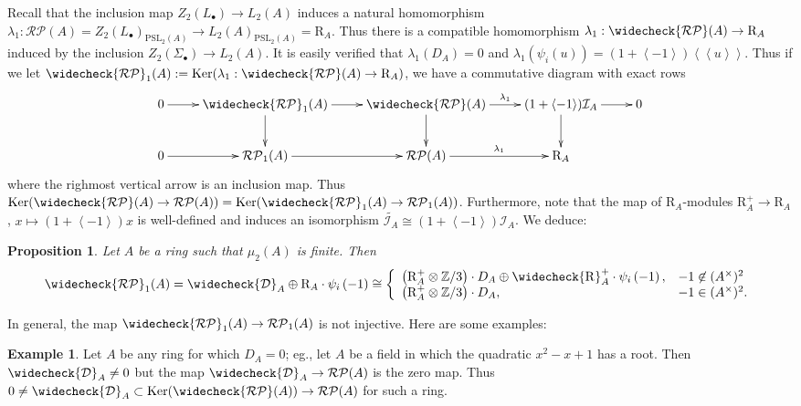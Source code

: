 \documentclass[12pt]{amsart}
\newtheorem{prop}[lem]{Proposition}
\theoremstyle{definition}
\newtheorem{exa}[lem]{Example}
\newcommand{\Z}{\Bbb{Z}}
\newcommand{\pspl}[2]{\mathrm{PSL}_{#1}(#2)}
\newcommand{\rpb}[1]{\mathcal{RP}(#1)}%
\newcommand{\rpbker}[1]{\mathcal{RP}_1(#1)}%
\newcommand{\crpbker}[1]{\widecheck{\mathcal{RP}}_1(#1)}
\newcommand{\crpb}[1]{\widecheck{\mathcal{RP}}(#1)}
\newcommand{\suss}[2]{\psi_{#1}\left( #2\right)}
\newcommand{\cconst}[1]{D_{#1}}
\newcommand{\ccconstmod}[1]{\widecheck{\mathcal{D}}_{#1}}
\newcommand{\<}{\langle}
\renewcommand{\>}{\rangle}
\renewcommand{\ker}[1]{\mathrm{Ker}(#1)}
\newcommand{\sgr}[1]{\mathrm{R}_{#1}}%
\newcommand{\qsgr}[1]{\mathrm{R}^{+}_{#1}} %
\newcommand{\tsgr}[1]{\widecheck{\mathrm{R}}^{+}_{#1}} %
\newcommand{\an}[1]{\left\langle{#1}\right\rangle}
\newcommand{\pf}[1]{\left\langle\!\left\langle{#1}\right\rangle\!\right\rangle}
\newcommand{\aug}[1]{\mathcal{I}_{#1}}
\begin{document}
Recall that the inclusion map $Z_2(L_\bullet)\to L_2(A)$ induces a natural homomorphism $\lambda_1:\rpb{A}=Z_2(L_\bullet)_{\pspl{2}{A}}\to L_2(A)_{\pspl{2}{A}}=\sgr{A}$. Thus there is a compatible homomorphism $\lambda_1:\crpb{A}\to \sgr{A}$ induced by the inclusion $Z_2(\Sigma_\bullet)\to L_2(A)$.  It is easily verified that $\lambda_1(\cconst{A})=0$ and $\lambda_1(\suss{i}{u})=(1+\an{-1})\pf{u}$. Thus if we let $\crpbker{A}:=\ker{\lambda_1:\crpb{A}\to \sgr{A}}$, we have a commutative diagram with exact rows
\[
\xymatrix{
0\ar[r]&\crpbker{A}\ar[r]\ar[d]&\crpb{A}\ar^-{\lambda_1}[r]\ar[d]&(1+\an{-1})\aug{A}\ar[r]\ar[d]&0\\
0\ar[r]&\rpbker{A}\ar[r]&\rpb{A}\ar^-{\lambda_1}[r]&\sgr{A}&\\
}
\]
where the righmost vertical arrow is an inclusion map. Thus $\ker{\crpb{A}\to\rpb{A}}=\ker{\crpbker{A}\to\rpbker{A}}$.  Furthermore, note that the map of $\sgr{A}$-modules
$\qsgr{A}\to\sgr{A}$, $x\mapsto (1+\an{-1})x$ is well-defined and induces an isomorphism $\tilde{\aug{A}}\cong (1+\an{-1})\aug{A}$. We deduce:
\begin{prop}\label{prop:crpbker}
 Let $A$ be a ring such that $\mu_2(A)$ is finite. Then
 \[
\crpbker{A}=\ccconstmod{A}\oplus \sgr{A}\cdot\suss{i}{-1}\cong
\left\{
\begin{array}{ll}
\left(\qsgr{A}\otimes\Z/3\right)\cdot\cconst{A}\oplus \tsgr{A}\cdot\suss{i}{-1},& -1\not\in (A^\times)^2\\
\left(\qsgr{A}\otimes\Z/3\right)\cdot\cconst{A}, &-1\in (A^\times)^2.\\
\end{array}
\right.
\]
\end{prop}

In general, the map $\crpbker{A}\to \rpbker{A}$ is not injective. Here are some examples:

\begin{exa}  Let $A$ be any ring for which $\cconst{A}=0$; eg., let $A$ be a field in which the quadratic $x^2-x+1$ has a root. Then $\ccconstmod{A}\not=0$ but the 
map $\ccconstmod{A}\to \rpb{A}$ is the zero map. Thus $0\not= \ccconstmod{A}\subset \ker{\crpb{A}}\to \rpb{A}$  for such a ring.

\end{exa}
\end{document}
